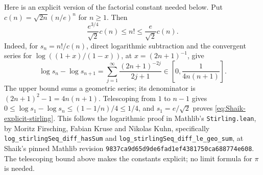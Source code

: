 Here is an explicit version of the factorial constant needed below.
Put \(c(n)=\sqrt{2n}(n/e)^n\) for \(n\ge1\). Then
\begin{equation}\label{eq:Shaik-explicit-stirling}
 \frac{e^{3/4}}{\sqrt2}c(n)\le n!\le\frac e{\sqrt2}c(n).
\end{equation}
Indeed, for \(s_n=n!/c(n)\), direct logarithmic subtraction and
the convergent series for \(\log((1+x)/(1-x))\), at \(x=(2n+1)^{-1}\),
give
\[
 \log s_n-\log s_{n+1}
 =\sum_{j=1}^{\infty}\frac{(2n+1)^{-2j}}{2j+1}
 \in\left[0,\frac1{4n(n+1)}\right].
\]
The upper bound sums a geometric series; its denominator is
\((2n+1)^2-1=4n(n+1)\).
Telescoping from \(1\) to \(n-1\) gives
\(0\le\log s_1-\log s_n\le(1-1/n)/4\le1/4\),
and \(s_1=e/\sqrt2\) proves \eqref{eq:Shaik-explicit-stirling}.
This follows the logarithmic proof in Mathlib's
\texttt{Stirling.lean}, by Moritz Firsching, Fabian Kruse and
Nikolas Kuhn, specifically
\texttt{log\_stirlingSeq\_diff\_hasSum} and
\texttt{log\_stirlingSeq\_diff\_le\_geo\_sum},
at Shaik's pinned Mathlib revision
\texttt{9837ca9d65d9de6fad1ef4381750ca688774e608}.
The telescoping bound above makes the constants explicit;
no limit formula for \(\pi\) is needed.

